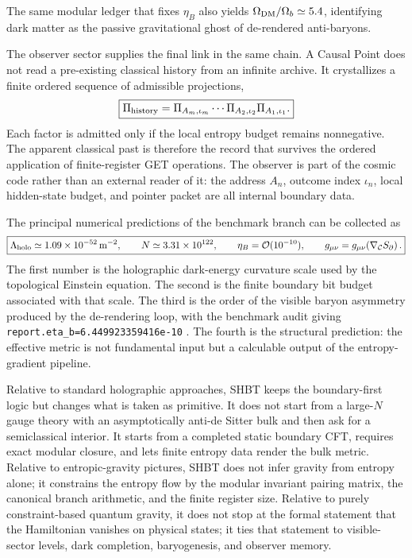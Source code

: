 \documentclass[11pt]{article}
\DeclareRobustCommand{\pyvar}[1]{%
  \ifmmode\text{\nolinkurl{#1}}\else\nolinkurl{#1}\fi%
}
\newcommand{\Lholo}{\Lambda_{\rm holo}}
\newcommand{\Nbits}{N}
\begin{document}
The same modular ledger that fixes \(\eta_B\) also yields
\(\Omega_{\rm DM}/\Omega_b\simeq5.4\), identifying dark matter as the passive
gravitational ghost of de-rendered anti-baryons.

The observer sector supplies the final link in the same chain.  A Causal Point
does not read a pre-existing classical history from an infinite archive.  It
crystallizes a finite ordered sequence of admissible projections,
\begin{equation}
\label{eq:section-nine-history-crystallization}
 \boxed{
 \Pi_{\rm history}
 =
 \Pi_{A_m,\iota_m}\cdots\Pi_{A_2,\iota_2}\Pi_{A_1,\iota_1}.
 }
\end{equation}
Each factor is admitted only if the local entropy budget remains nonnegative.
The apparent classical past is therefore the record that survives the ordered
application of finite-register GET operations.  The observer is part of the
cosmic code rather than an external reader of it: the address $A_n$, outcome
index $\iota_n$, local hidden-state budget, and pointer packet are all internal
boundary data.

The principal numerical predictions of the benchmark branch can be collected
as
\begin{equation}
\label{eq:section-nine-prediction-summary}
 \boxed{
 \Lholo\simeq1.09\times10^{-52}\,{\rm m}^{-2},
 \qquad
 \Nbits\simeq3.31\times10^{122},
 \qquad
 \eta_B=\mathcal O(10^{-10}),
 \qquad
 g_{\mu\nu}=g_{\mu\nu}\!\left(\nabla_{\mathcal C}S_{\partial}\right).
 }
\end{equation}
The first number is the holographic dark-energy curvature scale used by the
topological Einstein equation.  The second is the finite boundary bit budget
associated with that scale.  The third is the order of the visible baryon
asymmetry produced by the de-rendering loop, with the benchmark audit giving
\pyvar{report.eta_b=6.449923359416e-10}.  The fourth is the structural prediction:
the effective metric is not fundamental input but a calculable output of the
entropy-gradient pipeline.

Relative to standard holographic approaches, SHBT keeps the boundary-first
logic but changes what is taken as primitive.  It does not start from a
large-$N$ gauge theory with an asymptotically anti-de Sitter bulk and then ask
for a semiclassical interior.  It starts from a completed static boundary CFT,
requires exact modular closure, and lets finite entropy data render the bulk
metric.  Relative to entropic-gravity pictures, SHBT does not infer gravity
from entropy alone; it constrains the entropy flow by the modular invariant
pairing matrix, the canonical branch arithmetic, and the finite register size.
Relative to purely constraint-based quantum gravity, it does not stop at the
formal statement that the Hamiltonian vanishes on physical states; it ties that
statement to visible-sector levels, dark completion, baryogenesis, and
observer memory.
\end{document}
